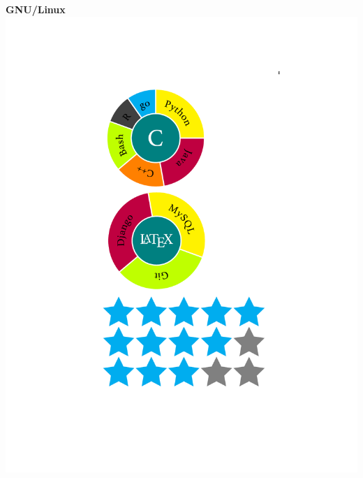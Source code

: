 \documentclass[]{friggeri-cv}
\begin{document}
\begin{aside}
    \textbf{GNU/Linux}\includegraphics[scale=0.16]{img/4stars}

\end{aside}
\end{document}
